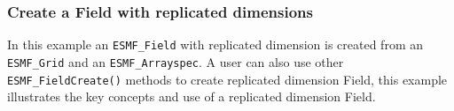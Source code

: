  
\setlength{\oldparskip}{\parskip}
\setlength{\parskip}{1.5ex}
\setlength{\oldparindent}{\parindent}
\setlength{\parindent}{0pt}
\setlength{\oldbaselineskip}{\baselineskip}
\setlength{\baselineskip}{11pt}
 
\def\bv{\begin{verbatim}}
\def\ev{\end{verbatim}}
\def\be{\begin{equation}}
\def\ee{\end{equation}}
\def\bea{\begin{eqnarray}}
\def\eea{\end{eqnarray}}
\def\bi{\begin{itemize}}
\def\ei{\end{itemize}}
\def\bn{\begin{enumerate}}
\def\en{\end{enumerate}}
\def\bd{\begin{description}}
\def\ed{\end{description}}
\def\({\left (}
\def\){\right )}
\def\[{\left [}
\def\]{\right ]}
\def\<{\left  \langle}
\def\>{\right \rangle}
\def\cI{{\cal I}}
\def\diag{\mathop{\rm diag}}
\def\tr{\mathop{\rm tr}}


 

  \subsubsection{Create a Field with replicated dimensions}
  \label{sec:field:usage:create_repdim}
  
    \begin{sloppypar}
    In this example an {\tt ESMF\_Field} with replicated dimension is created from an {\tt ESMF\_Grid} and
    an {\tt ESMF\_Arrayspec}. A user can also use other {\tt ESMF\_FieldCreate()} methods to create replicated
    dimension Field, this example illustrates the key concepts and use of a replicated dimension Field.
    \end{sloppypar}
  
